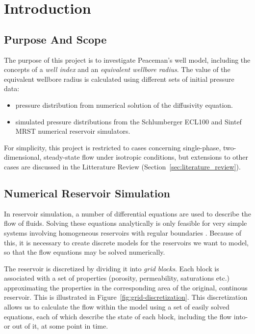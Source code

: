 
\section{Introduction} %
\label{sec:introduction}
\subsection{Purpose And Scope} %
\label{sub:purpose_and_scope}
The purpose of this project is to investigate Peaceman's well model, including the concepts of a \emph{well index} and an \emph{equivalent wellbore radius}. The value of the equivalent wellbore radius is calculated using different sets of initial pressure data:
\begin{itemize}
    \item pressure distribution from numerical solution of the diffusivity equation.
    \item simulated pressure distributions from the Schlumberger ECL100 and Sintef MRST numerical reservoir simulators.
\end{itemize}

For simplicity, this project is restricted to cases concerning single-phase, two-dimensional, steady-state flow under isotropic conditions, but extensions to other cases are discussed in the Litterature Review (Section~\ref{sec:literature_review}).

\subsection{Numerical Reservoir Simulation} %
\label{sub:numerical_reservoir_simulation}
In reservoir simulation, a number of differential equations are used to describe the flow of fluids. Solving these equations analytically is only feasible for very simple systems involving homogeneous reservoirs with regular boundaries \cite{Peaceman1977Fundamentals}. Because of this, it is necessary to create discrete models for the reservoirs we want to model, so that the flow equations may be solved numerically.


The reservoir is discretized by dividing it into \emph{grid blocks}. Each block is associated with a set of properties (porosity, permeability, saturations etc.) approximating the properties in the corresponding area of the original, continous reservoir. This is illustrated in Figure~\ref{fig:grid-discretization}. This discretization allows us to calculate the flow within the model using a set of easily solved equations, each of which describe the state of each block, including the flow into- or out of it, at some point in time.


